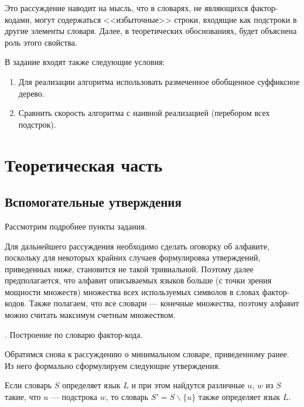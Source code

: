 \documentclass[14pt, russian]{scrartcl}
\begin{document}
Это рассуждение наводит на мысль, что в словарях, не являющихся фактор-кодами, могут содержаться <<избыточные>> строки, входящие как подстроки в другие элементы словаря. Далее, в теоретических обоснованиях, будет объяснена роль этого свойства.

В задание входят также следующие условия:

\begin{enumerate}
\item Для реализации алгоритма использовать размеченное обобщенное суффиксное дерево.
\item Сравнить скорость алгоритма с наивной реализацией (перебором всех подстрок).
\end{enumerate}




\newpage
\section{Теоретическая часть}


\subsection{Вспомогательные утверждения}

Рассмотрим подробнее пункты задания. 

Для дальнейшего рассуждения необходимо сделать оговорку об алфавите, поскольку для некоторых крайних случаев формулировка утверждений, приведенных ниже, становится не такой тривиальной. Поэтому далее предполагается, что алфавит описываемых языков больше (с точки зрения мощности множеств) множества всех используемых символов в словах фактор-кодов. Также полагаем, что все словари --- конечные множества, поэтому алфавит можно считать максимум счетным множеством. 

\vspace{10pt}

{. Построение по словарю фактор-кода.

}

\vspace{4pt}

Обратимся снова к рассуждению о минимальном словаре, приведенному ранее. Из него формально сформулируем следующие утверждения.

\begin{Statement}
\label{stat::min}
Если словарь $S$ определяет язык $L$ и при этом найдутся различные $u,\, w$ из $S$ такие, что $u$ --- подстрока $w$, то словарь $S' = S \backslash \{u\}$ также определяет язык $L$. 
\end{Statement}
\end{document}
